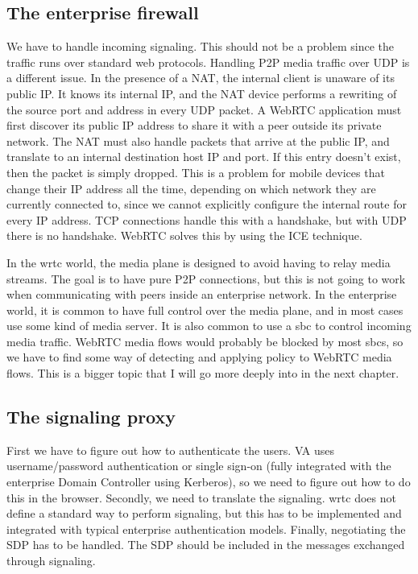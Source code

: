 \subsection{The enterprise firewall}
We have to handle incoming signaling. This should not be a problem since the traffic runs over standard web protocols. Handling P2P media traffic over UDP is a different issue. In the presence of a NAT, the internal client is unaware of its public IP. It knows its internal IP, and the NAT device performs a rewriting of the source port and address in every UDP packet. A WebRTC application must first discover its public IP address to share it with a peer outside its private network. The NAT must also handle packets that arrive at the public IP, and translate to an internal destination host IP and port. If this entry doesn't exist, then the packet is simply dropped. This is a problem for mobile devices that change their IP address all the time, depending on which network they are currently connected to, since we cannot explicitly configure the internal route for every IP address. TCP connections handle this with a handshake, but with UDP there is no handshake. WebRTC solves this by using the ICE technique.

In the \gls{wrtc} world, the media plane is designed to avoid having to relay media streams. The goal is to have pure P2P connections, but this is not going to work when communicating with peers inside an enterprise network. In the enterprise world, it is common to have full control over the media plane, and in most cases use some kind of media server. It is also common to use a \gls{sbc} to control incoming media traffic. WebRTC media flows would probably be blocked by most \gls{sbc}s, so we have to find some way of detecting and applying policy to WebRTC media flows. This is a bigger topic that I will go more deeply into in the next chapter.

\subsection{The signaling proxy}
First we have to figure out how to authenticate the users. VA uses username/password authentication or single sign-on (fully integrated with the enterprise Domain Controller using Kerberos), so we need to figure out how to do this in the browser. Secondly, we need to translate the signaling. \gls{wrtc} does not define a standard way to perform signaling, but this has to be implemented and integrated with typical enterprise authentication models. Finally, negotiating the SDP has to be handled. The SDP should be included in the messages exchanged through signaling.
 

